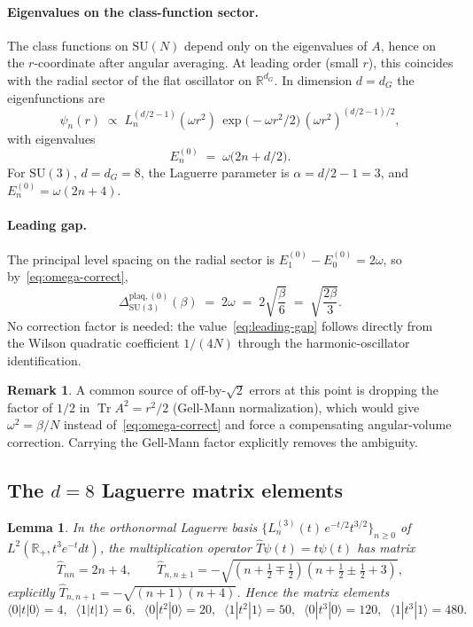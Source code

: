 \documentclass[11pt,a4paper]{article}
\newtheorem{lemma}[theorem]{Lemma}
\theoremstyle{definition}
\newtheorem{remark}[theorem]{Remark}
\newcommand{\SU}{\mathrm{SU}}
\newcommand{\Tr}{\operatorname{Tr}}
\newcommand{\R}{\mathbb{R}}
\newcommand{\half}{\tfrac{1}{2}}
\begin{document}
\paragraph{Eigenvalues on the class-function sector.}
The class functions on $\SU(N)$ depend only on the eigenvalues
of $A$, hence on the $r$-coordinate after angular averaging.
At leading order (small $r$), this coincides with the radial sector
of the flat oscillator on $\R^{d_G}$. In dimension $d=d_G$ the
eigenfunctions are
\[
\psi_n(r) \;\propto\; L_n^{(d/2-1)}(\omega r^2)\,
\exp\!\bigl(-\omega r^2/2\bigr)\,(\omega r^2)^{(d/2-1)/2},
\]
with eigenvalues
\[
E_n^{(0)} \;=\; \omega\bigl(2n + d/2\bigr).
\]
For $\SU(3)$, $d = d_G = 8$, the Laguerre parameter is
$\alpha = d/2 - 1 = 3$, and $E_n^{(0)} = \omega(2n+4)$.

\paragraph{Leading gap.}
The principal level spacing on the radial sector is $E_1^{(0)} - E_0^{(0)} = 2\omega$, so by~\eqref{eq:omega-correct},
\begin{equation}\label{eq:leading-gap}
{\Delta^{\mathrm{plaq},(0)}_{\SU(3)}}(\beta)
\;=\;
2\omega
\;=\;
2\sqrt{\frac{\beta}{6}}
\;=\;
\sqrt{\frac{2\beta}{3}}.
\end{equation}
No correction factor is needed: the value~\eqref{eq:leading-gap}
follows directly from the Wilson quadratic coefficient $1/(4N)$
through the harmonic-oscillator identification.

\begin{remark}
A common source of off-by-$\sqrt{2}$ errors at this point is dropping
the factor of $1/2$ in $\Tr A^2 = r^2/2$ (Gell-Mann normalization),
which would give $\omega^2 = \beta/N$ instead of~\eqref{eq:omega-correct}
and force a compensating angular-volume correction. Carrying the
Gell-Mann factor explicitly removes the ambiguity.
\end{remark}

\subsection{The $d=8$ Laguerre matrix elements}

\begin{lemma}\label{lem:laguerre-8}
In the orthonormal Laguerre basis $\{L_n^{(3)}(t)\,e^{-t/2}t^{3/2}\}_{n\ge 0}$
of $L^2(\R_+, t^3e^{-t}dt)$, the multiplication operator
$\hat T \psi(t) = t\psi(t)$ has matrix
\[
\hat T_{nn} = 2n+4,
\qquad
\hat T_{n,n\pm 1} = -\sqrt{(n+\half\mp\half)(n+\half\pm\half+3)},
\]
explicitly $\hat T_{n,n+1} = -\sqrt{(n+1)(n+4)}$. Hence the matrix
elements
\[
\langle 0|t|0\rangle = 4,\;\;
\langle 1|t|1\rangle = 6,\;\;
\langle 0|t^2|0\rangle = 20,\;\;
\langle 1|t^2|1\rangle = 50,\;\;
\langle 0|t^3|0\rangle = 120,\;\;
\langle 1|t^3|1\rangle = 480.
\]
\end{lemma}
\end{document}
